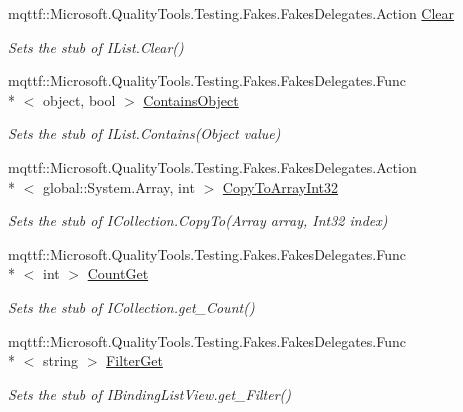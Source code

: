 \begin{DoxyCompactItemize}
mqttf\-::\-Microsoft.\-Quality\-Tools.\-Testing.\-Fakes.\-Fakes\-Delegates.\-Action \hyperlink{class_system_1_1_component_model_1_1_fakes_1_1_stub_i_binding_list_view_a441bb95553a16f744e9788b20a35fccd}{Clear}
\begin{DoxyCompactList}\small\item\em Sets the stub of I\-List.\-Clear()\end{DoxyCompactList}\item 
mqttf\-::\-Microsoft.\-Quality\-Tools.\-Testing.\-Fakes.\-Fakes\-Delegates.\-Func\\*
$<$ object, bool $>$ \hyperlink{class_system_1_1_component_model_1_1_fakes_1_1_stub_i_binding_list_view_a7c724e9039cfb5111487f539c2a498f1}{Contains\-Object}
\begin{DoxyCompactList}\small\item\em Sets the stub of I\-List.\-Contains(\-Object value)\end{DoxyCompactList}\item 
mqttf\-::\-Microsoft.\-Quality\-Tools.\-Testing.\-Fakes.\-Fakes\-Delegates.\-Action\\*
$<$ global\-::\-System.\-Array, int $>$ \hyperlink{class_system_1_1_component_model_1_1_fakes_1_1_stub_i_binding_list_view_afe08dff83aed14754be770533b938632}{Copy\-To\-Array\-Int32}
\begin{DoxyCompactList}\small\item\em Sets the stub of I\-Collection.\-Copy\-To(\-Array array, Int32 index)\end{DoxyCompactList}\item 
mqttf\-::\-Microsoft.\-Quality\-Tools.\-Testing.\-Fakes.\-Fakes\-Delegates.\-Func\\*
$<$ int $>$ \hyperlink{class_system_1_1_component_model_1_1_fakes_1_1_stub_i_binding_list_view_a38939ae6c15af958a80e3b8dd089ecdd}{Count\-Get}
\begin{DoxyCompactList}\small\item\em Sets the stub of I\-Collection.\-get\-\_\-\-Count()\end{DoxyCompactList}\item 
mqttf\-::\-Microsoft.\-Quality\-Tools.\-Testing.\-Fakes.\-Fakes\-Delegates.\-Func\\*
$<$ string $>$ \hyperlink{class_system_1_1_component_model_1_1_fakes_1_1_stub_i_binding_list_view_a892f594b673d1b3bb8032491c511c55c}{Filter\-Get}
\begin{DoxyCompactList}\small\item\em Sets the stub of I\-Binding\-List\-View.\-get\-\_\-\-Filter()\end{DoxyCompactList}\item 

\end{DoxyCompactItemize}
